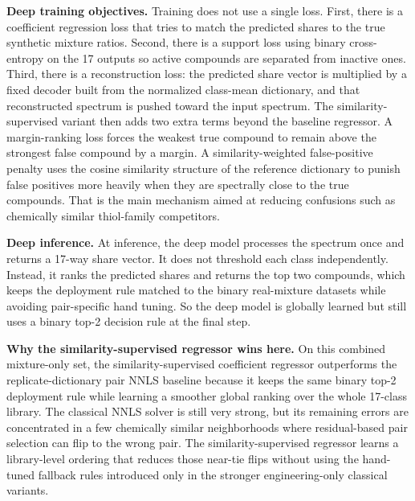 \documentclass[11pt]{article}
\begin{document}
\textbf{Deep training objectives.} Training does not use a single loss. First, there is a coefficient regression loss that tries to match the predicted shares to the true synthetic mixture ratios. Second, there is a support loss using binary cross-entropy on the 17 outputs so active compounds are separated from inactive ones. Third, there is a reconstruction loss: the predicted share vector is multiplied by a fixed decoder built from the normalized class-mean dictionary, and that reconstructed spectrum is pushed toward the input spectrum. The similarity-supervised variant then adds two extra terms beyond the baseline regressor. A margin-ranking loss forces the weakest true compound to remain above the strongest false compound by a margin. A similarity-weighted false-positive penalty uses the cosine similarity structure of the reference dictionary to punish false positives more heavily when they are spectrally close to the true compounds. That is the main mechanism aimed at reducing confusions such as chemically similar thiol-family competitors.

\textbf{Deep inference.} At inference, the deep model processes the spectrum once and returns a 17-way share vector. It does not threshold each class independently. Instead, it ranks the predicted shares and returns the top two compounds, which keeps the deployment rule matched to the binary real-mixture datasets while avoiding pair-specific hand tuning. So the deep model is globally learned but still uses a binary top-2 decision rule at the final step.

\textbf{Why the similarity-supervised regressor wins here.} On this combined mixture-only set, the similarity-supervised coefficient regressor outperforms the replicate-dictionary pair NNLS baseline because it keeps the same binary top-2 deployment rule while learning a smoother global ranking over the whole 17-class library. The classical NNLS solver is still very strong, but its remaining errors are concentrated in a few chemically similar neighborhoods where residual-based pair selection can flip to the wrong pair. The similarity-supervised regressor learns a library-level ordering that reduces those near-tie flips without using the hand-tuned fallback rules introduced only in the stronger engineering-only classical variants.
\end{document}
